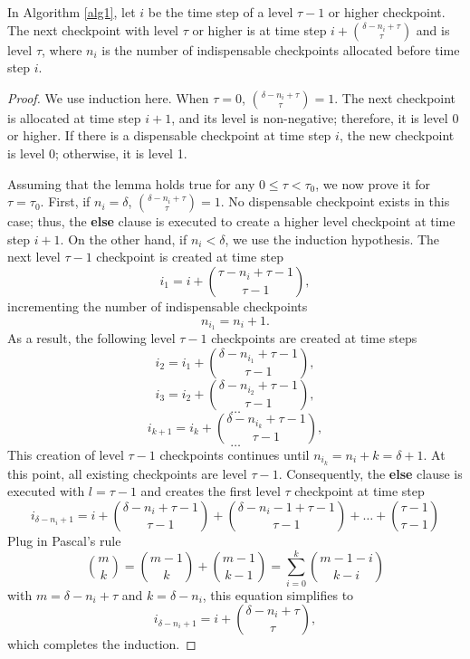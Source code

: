 \begin{lemma} \label{lem0}
    In Algorithm \ref{alg1}, let $i$ be the time step of a level $\tau - 1$ or
    higher checkpoint.  The next checkpoint with level $\tau$ or higher is at
    time step $i + \binom{\delta - n_i + \tau}{\tau}$ and is level
    $\tau$, where $n_i$ is the number of indispensable checkpoints allocated
    before time step $i$.
\end{lemma}
\begin{proof}
    We use induction here.  When $\tau = 0$, 
    $\binom{\delta - n_i + \tau}{\tau} = 1$.  The next checkpoint is allocated
    at time step $i + 1$, and its level is non-negative; therefore, it is
    level 0 or higher.  If there is a dispensable checkpoint at time step $i$,
    the new checkpoint is level 0; otherwise, it is level 1.

    Assuming that the lemma holds true for any $0 \le \tau < \tau_0$,
    we now prove it for $\tau = \tau_0$.  First, if $n_i = \delta$,
    $\binom{\delta - n_i + \tau}{\tau} = 1$.
    No dispensable checkpoint exists in this case; thus, the {\bf else} clause
    is executed to create a higher level checkpoint at time step $i + 1$.
    On the other hand, if $n_i < \delta$, we use the induction hypothesis.
    The next level $\tau - 1$ checkpoint is created at time step 
    $$i_1 = i + \binom{\tau - n_i + \tau - 1}{\tau - 1},$$
    incrementing the number of indispensable checkpoints
    $$n_{i_1} = n_i + 1.$$
    As a result, the following level $\tau - 1$ checkpoints are created at time
    steps
    $$i_2 = i_1 + \binom{\delta - n_{i_1} + \tau - 1}{\tau - 1},$$
    $$i_3 = i_2 + \binom{\delta - n_{i_2} + \tau - 1}{\tau - 1},$$
    $$\ldots$$
    $$i_{k + 1} = i_k + \binom{\delta - n_{i_k} + \tau - 1}{\tau - 1},$$
    $$\ldots$$
    This creation of level $\tau - 1$ checkpoints continues until
    $n_{i_k} = n_i + k = \delta + 1$.  At this point, all existing checkpoints
    are level $\tau - 1$.  Consequently, the {\bf else} clause is executed with
    $l = \tau - 1$ and creates the first level $\tau$ checkpoint at time step
    \[ i_{\delta - n_i + 1} = i + \binom{\delta - n_i + \tau - 1}{\tau - 1}
        + \binom{\delta - n_i - 1 + \tau - 1}{\tau - 1} + \ldots
        + \binom{\tau - 1}{\tau - 1} \]
    Plug in Pascal's rule
    $$\binom{m}{k} = \binom{m - 1}{k} + \binom{m - 1}{k - 1}
       = \sum_{i = 0}^k \binom{m - 1 - i}{k - i}$$
    with $m = \delta - n_i + \tau$ and $k = \delta - n_i$, this equation
    simplifies to
    \[ i_{\delta - n_i + 1} = i + \binom{\delta - n_i + \tau}{\tau}, \]
    which completes the induction.
\end{proof}

